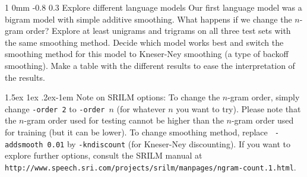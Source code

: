 \documentclass[11pt]{article}
\makeatletter
\newcommand{\newsec}[2]{\section{#1}\label{sec:#2}\noindent}
\renewcommand{\section}{\@startsection
{section}%
{1}%
{0mm}%
{-0.8\baselineskip}%
{0.3\baselineskip}%
{\bfseries\large}}%
\renewcommand{\paragraph}{%
  \@startsection{paragraph}{4}%
  {\z@}{1.5ex \@plus 1ex \@minus .2ex}{-1em}%
  {\normalfont\normalsize\bfseries}%
}\makeatother
\makeatother
\begin{document}
\newsec{Explore different language models }{models}%
Our first language model was a bigram model with simple additive
smoothing. What happens if we change the $n$-gram order?  Explore at
least unigrams and trigrams on all three test sets with the same
smoothing method. Decide which model works best and switch the
smoothing method for this model to Kneser-Ney smoothing (a type of
backoff smoothing). 
Make a table with the different results to ease the interpretation of the
results.

\paragraph{Note on SRILM options:} To change the $n$-gram order,
simply change {\tt -order~2} to {\tt -order~$n$} (for whatever $n$
you want to try).  Please note that the $n$-gram order used for
testing cannot be higher than the $n$-gram order used for training
(but it can be lower). To change smoothing method, replace {\tt
  -addsmooth~0.01} by {\tt -kndiscount} (for Kneser-Ney
discounting). If you want to explore further options, consult the
SRILM manual at {\small {\tt
    http://www.speech.sri.com/projects/srilm/manpages/ngram-count.1.html}}.
\end{document}
